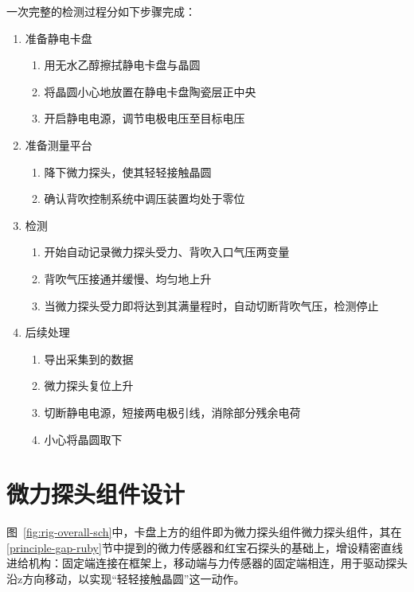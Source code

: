 一次完整的检测过程分如下步骤完成：

\begin{enumerate}
  \item 准备静电卡盘
  \begin{enumerate}
    \item 用无水乙醇擦拭静电卡盘与晶圆
    \item 将晶圆小心地放置在静电卡盘陶瓷层正中央
    \item 开启静电电源，调节电极电压至目标电压
  \end{enumerate}
  
  \item 准备测量平台
  \begin{enumerate}
    \item 降下微力探头，使其轻轻接触晶圆
    \item 确认背吹控制系统中调压装置均处于零位
  \end{enumerate}
  
  \item 检测
  \begin{enumerate}
    \item 开始自动记录微力探头受力、背吹入口气压两变量
    \item 背吹气压接通并缓慢、均匀地上升
    \item 当微力探头受力即将达到其满量程时，自动切断背吹气压，检测停止
  \end{enumerate}
  
  \item 后续处理
  \begin{enumerate}
    \item 导出采集到的数据
    \item 微力探头复位上升
    \item 切断静电电源，短接两电极引线，消除部分残余电荷
    \item 小心将晶圆取下
  \end{enumerate}
\end{enumerate}



\clearpage



\section{微力探头组件设计}\label{sec:rig-probe}

图~\ref{fig:rig-overall-sch}中，卡盘上方的组件即为微力探头组件微力探头组件，其在\ref{principle-gap-ruby}节中提到的微力传感器和红宝石探头的基础上，增设精密直线进给机构：固定端连接在框架上，移动端与力传感器的固定端相连，用于驱动探头沿z方向移动，以实现“轻轻接触晶圆”这一动作。


